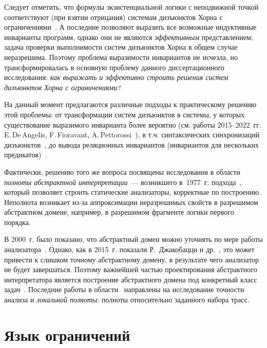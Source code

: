 Следует отметить, что формулы экзистенциальной логики с неподвижной точкой соответствуют (при взятии отрицания) системам дизъюнктов Хорна с ограничениями~\cite{Bjorner2015}.
А последние позволяют выразить все возможные индуктивные инварианты программ, однако они не являются \emph{эффективным} представлением: задача проверки выполнимости систем дизъюнктов Хорна в общем случае неразрешима.
Поэтому проблема выразимости инвариантов не исчезла, но трансформировалась в основную проблему данного диссертационного исследования:
\emph{как выражать и эффективно строить решения систем дизъюнктов Хорна с ограничениями?}


На данный момент предлагаются различные подходы к практическому решению этой проблемы: от трансформации систем дизъюнктов в системы, у которых существование выразимого инварианта более вероятно (см. работы \numrange{2015}{2022}~гг. E.\,De\,Angelis,
F.\,Fioravant, A.\,Pettorossi~\cite{angelis_fioravanti_pettorossi_proietti_2015,10.1007/978-3-662-53413-7_8,10.1093/logcom/exab090,pettorossi_proietti_2022,10.1007/978-3-030-51074-9_6,angelis_fioravanti_pettorossi_proietti_2018}), в т.\:ч. синтаксических синхронизаций дизъюнктов~\cite{10.1007/978-3-662-53413-7_8,LPAR-21:Synchronizing_Constrained_Horn_Clauses}, до вывода реляционных инвариантов (инвариантов для нескольких предикатов)~\cite{mordvinov2020,DBLP:journals/corr/abs-2304-12588}.

Фактически, решению того же вопроса посвящены исследования в области \emph{полноты абстрактной интерпретации}~--- возникшего в~1977~г. подхода~\cite{10.1145/512950.512973}, который позволяет строить статические анализаторы, корректные по построению.
Неполнота возникает из-за аппроксимации неразрешимых свойств в разрешимом абстрактном домене, например, в разрешимом фрагменте логики первого порядка.


В 2000~г. было показано, что абстрактный домен можно уточнять по мере работы анализатора~\cite{10.1145/333979.333989}. Однако, как в 2015~г. показали Р.~Джакобацци и др.~\cite{giacobazzi2015analyzing}, это может привести к слишком точному абстрактному домену, в результате чего анализатор не будет завершаться.
Поэтому важнейшей частью проектирования абстрактного интерпретатора является построение абстрактного домена под конкретный класс задач~\cite{10.1093/logcom/2.4.511}.
Последние работы в области~\cite{10.1145/3498721,9470608} направлены на исследование точности анализа и \emph{локальной полноты}: полноты относительно заданного набора трасс.

\section{Язык ограничений}\label{sec:background/assertionLang}

